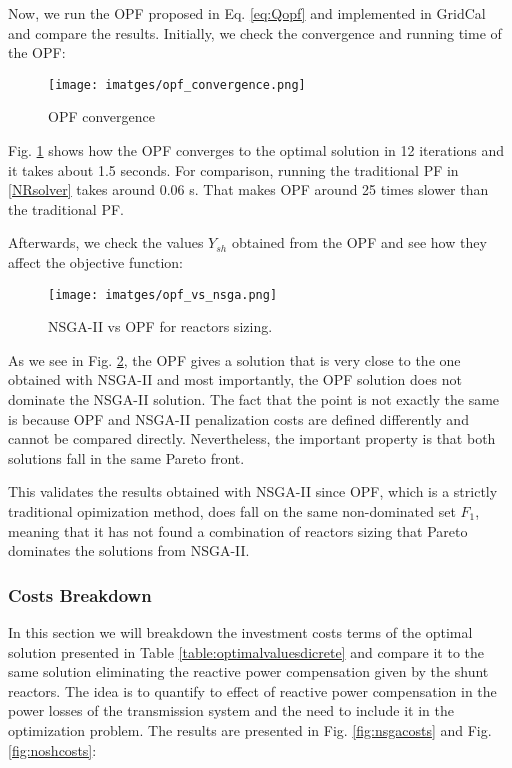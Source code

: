 \documentclass[a4paper,11pt, titlepage, twoside]{article}
\begin{document}
Now, we run the OPF proposed in Eq. \ref{eq:Qopf} and implemented in GridCal and compare the results. Initially, we check the convergence and running time of the OPF:
\begin{figure}[H]
    \centering
    \texttt{[image: imatges/opf\_convergence.png]}
    \caption{OPF convergence}
    \label{fig:opfconv}   
\end{figure}

Fig. \ref{fig:opfconv} shows how the OPF converges to the optimal solution in 12 iterations and it takes about 1.5 seconds. For comparison, running the traditional PF in \ref{NRsolver} takes around 0.06 s.
That makes OPF around 25 times slower than the traditional PF.



Afterwards, we check the values $Y_{sh}$ obtained from the OPF and see how they affect the objective function:
\begin{figure}[H]
    \centering
    \texttt{[image: imatges/opf\_vs\_nsga.png]}
    \caption{NSGA-II vs OPF for reactors sizing.}
    \label{fig:opfvsnsga}   
\end{figure}

As we see in Fig. \ref{fig:opfvsnsga}, the OPF gives a solution that is very close to the one obtained with NSGA-II and most importantly, the OPF solution does not dominate the NSGA-II solution. The fact that the point is not exactly the same is because OPF and NSGA-II penalization costs are defined differently and
cannot be compared directly. Nevertheless, the important property is that both solutions fall in the same Pareto front.

This validates the results obtained with NSGA-II since OPF, which is a strictly traditional opimization method, does fall on the same non-dominated set $F_1$, meaning that it has not found a combination of reactors sizing that Pareto 
dominates the solutions from NSGA-II.

\subsubsection{Costs Breakdown}

In this section we will breakdown the investment costs terms of the optimal solution presented in Table \ref{table:optimalvaluesdicrete} and compare it to the same solution eliminating the reactive power compensation given by the shunt reactors. The idea is to quantify to effect of reactive power compensation
in the power losses of the transmission system and the need to include it in the optimization problem. The results are presented in Fig. \ref{fig:nsgacosts} and Fig. \ref{fig:noshcosts}:
\end{document}
